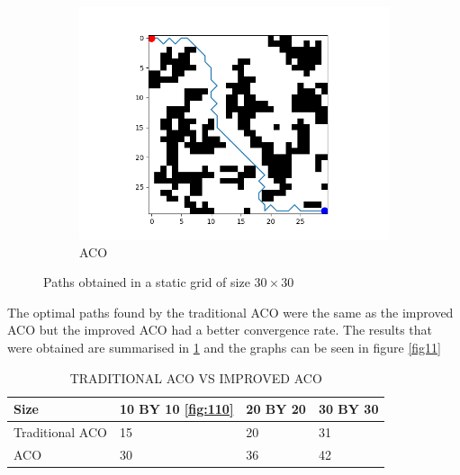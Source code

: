 \documentclass[conference]{IEEEtran}
\begin{document}
\begin{figure}[H]
     \begin{subfigure}[b]{0.4\textwidth}
     \centering
         \includegraphics[width=\textwidth]{30x30 grid (ACO improved).png} 
         \caption{ACO}
         \label{fig:xy}
     \end{subfigure}
     
     \caption{Paths obtained in a static grid of size $30 \times 30$}
    \label{fig10}
\end{figure}
The optimal paths found by the traditional ACO were the same as the improved ACO but the improved ACO had a better convergence rate. The results that were obtained are summarised in \ref{table5} and the graphs can be seen in figure \ref{fig11}
\begin{table}[htbp]
\caption{TRADITIONAL ACO VS IMPROVED ACO}
\begin{center}
\begin{tabular}{|l|l|l|l|}
\hline
Size              & 10 BY   10 \ref{fig:110}  & 20 BY   20 & 30 BY   30 \\ \hline
Traditional   ACO & 15         & 20         & 31         \\ \hline
ACO               & 30         & 36         & 42         \\ \hline
\end{tabular}
\label{table5}
\end{center}
\end{table}
\end{document}
